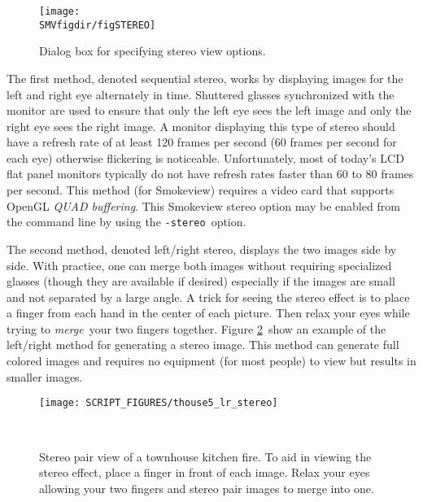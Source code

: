 \documentclass[11pt,twoside]{book}
\begin{document}
\begin{figure}[bph]
\begin{center}
\texttt{[image: \\SMVfigdir/figSTEREO]}
\caption{Dialog box for specifying stereo view options.}
\label{figstereodialog}
\end{center}
\end{figure}

The first method, denoted sequential stereo, works by displaying
images for the left and right eye alternately in time.  Shuttered
glasses  synchronized with the monitor are used to ensure that
only the left eye sees the left image and only the right eye sees
the right image.  A monitor displaying this type of stereo should
have a refresh rate of at least 120 frames per second (60 frames
per second for each eye) otherwise flickering is noticeable.
Unfortunately, most of today's LCD flat panel monitors typically
do not have refresh rates faster than 60 to 80 frames per second.
This method (for Smokeview) requires a video card that supports
OpenGL {\em QUAD buffering}. This Smokeview stereo option may be
enabled from the command line by using the {\tt -stereo}\ option.

The second method, denoted left/right stereo, displays the two
images side by side.  With practice, one can merge both images
without requiring specialized glasses (though they are available
if desired) especially if the images are small and not separated
by a large angle. A trick for seeing the stereo effect is to place
a finger from each hand in the center of each picture.  Then relax
your eyes while trying to {\em merge}\ your two fingers together.
Figure \ref{figlrstereo}\ show an example of the left/right method
for generating a stereo image.  This method can generate full
colored images and requires no equipment (for most people) to view
but results in smaller images.
\begin{figure}[bph]
\begin{center}
\texttt{[image: SCRIPT\_FIGURES/thouse5\_lr\_stereo]}
\caption[Stereo pair view of a townhouse kitchen fire.]{ Stereo
pair view of a townhouse kitchen fire. To aid in viewing the
stereo effect, place a finger in front of each image.  Relax your
eyes allowing your two fingers and stereo pair images to merge
into one. }\ \label{figlrstereo}
\end{center}
\end{figure}
\end{document}

